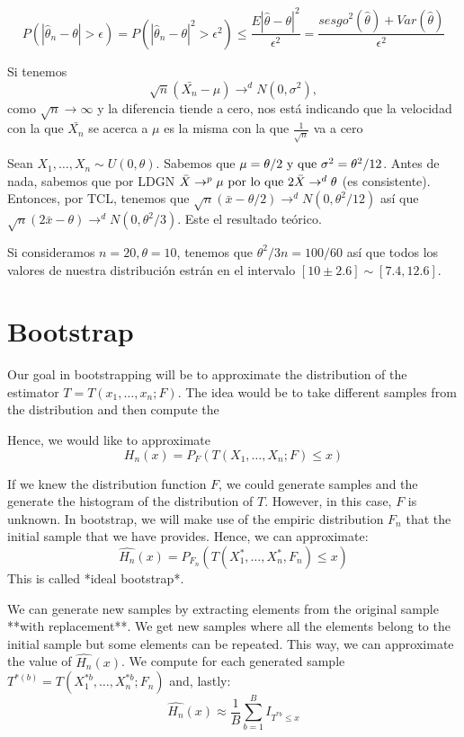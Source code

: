 \[
P(|\hat \theta_n - \theta | > \epsilon) = P(|\hat \theta_n - \theta |^2 > \epsilon^2) \leq \frac{E|\hat \theta - \theta|^2}{\epsilon^2} = \frac{sesgo^2(\hat\theta) + Var(\hat \theta)}{\epsilon^2} 
\]



Si tenemos 
\[
\sqrt{n} (\bar{X_n} - \mu)\to^d N(0,\sigma^2),
\]
 como \(\sqrt{n} \to \infty\) y la diferencia tiende a cero, nos está indicando que la velocidad con la que \(\bar{X_n}\) se acerca a \(\mu\) es la misma con la que \(\frac{1}{\sqrt{n}}\) va a cero




Sean \(X_1,\dots,X_n \sim U(0,\theta)\). Sabemos que \(\mu = \theta/2$ y que $\sigma^2 = \theta^2 / 12\).
Antes de nada, sabemos que por LDGN \(\bar X \to^p \mu $ por lo que $2\bar X \to^d \theta\) (es consistente). Entonces, por TCL, tenemos que \(\sqrt n (\bar x - \theta/2) \to^d N(0,\theta^2/12)\) así que \(\sqrt n (2\bar x - \theta)\to^d N(0,\theta^2/3)\). Este el resultado teórico.

Si consideramos $n = 20,\theta=10$, tenemos que $\theta^2/3n = 100/60$ así que todos los valores de nuestra distribución estrán en el intervalo $[10 \pm 2.6] \sim [7.4,12.6]$.



\section{Bootstrap}

Our goal in bootstrapping will be to approximate the distribution of the estimator $T= T(x_1,\dots,x_n;F)$. The idea would be to take different samples from the distribution and then compute the 

Hence, we would like to approximate
\[
H_n(x) = P_F(T(X_1,\dots,X_n;F) \leq x)
\]

If we knew the distribution function $F$, we could generate samples and the generate the histogram of the distribution of $T$. However, in this case, $F$ is unknown. In bootstrap, we will make use of the empiric distribution $F_n$ that the initial sample that we have provides. Hence, we can approximate:
\[
\hat{H_n}(x) = P_{F_n}(T(X^*_1,\dots,X^*_n,F_n)\leq x)
\]
This is called *ideal bootstrap*.

We can generate new samples by extracting elements from the original sample **with replacement**. We get new samples where all the elements belong to the initial sample but some elements can be repeated. This way, we can approximate the value of $\hat{H_n}(x)$. We compute for each generated sample $T^{*(b)} = T(X_1^{*b},\dots, X_n^{*b};F_n)$ and, lastly:
\[
\hat{H_n}(x) \approx \frac{1}{B} \sum_{b=1}^B I_{T^{*b} \leq x}
\]

